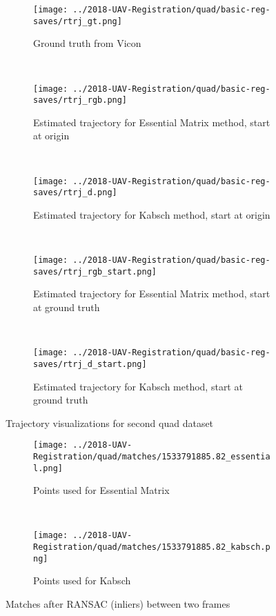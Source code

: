 \documentclass[12pt,a4paper]{article}
\begin{document}

\begin{figure}[p]
\begin{subfigure}[t]{\textwidth}
  \centering
    \texttt{[image: ../2018-UAV-Registration/quad/basic-reg-saves/rtrj\_gt.png]}
  \caption{Ground truth from Vicon}
  \end{subfigure}
  \\
  \begin{subfigure}[t]{0.5\textwidth}
  \centering
    \texttt{[image: ../2018-UAV-Registration/quad/basic-reg-saves/rtrj\_rgb.png]}
  \caption{Estimated trajectory for Essential Matrix method, start at origin}
  \end{subfigure}%
  ~
  \begin{subfigure}[t]{0.5\textwidth}
  \centering
    \texttt{[image: ../2018-UAV-Registration/quad/basic-reg-saves/rtrj\_d.png]}
  \caption{Estimated trajectory for Kabsch method, start at origin}
  \end{subfigure}
  \\
  \begin{subfigure}[t]{0.5\textwidth}
  \centering
    \texttt{[image: ../2018-UAV-Registration/quad/basic-reg-saves/rtrj\_rgb\_start.png]}
  \caption{Estimated trajectory for Essential Matrix method, start at ground truth}
  \end{subfigure}%
  ~
  \begin{subfigure}[t]{0.5\textwidth}
  \centering
    \texttt{[image: ../2018-UAV-Registration/quad/basic-reg-saves/rtrj\_d\_start.png]}
  \caption{Estimated trajectory for Kabsch method, start at ground truth}
  \end{subfigure}
  \caption{Trajectory visualizations for second quad dataset}
  \label{f: quad2 trj}
\end{figure}

\begin{figure}[h]
  \centering
  \begin{subfigure}[t]{\textwidth}
  \centering
  \texttt{[image: ../2018-UAV-Registration/quad/matches/1533791885.82\_essential.png]}
  \caption{Points used for Essential Matrix}
  \end{subfigure}%
  \\
  \begin{subfigure}[t]{\textwidth}
  \centering
  \texttt{[image: ../2018-UAV-Registration/quad/matches/1533791885.82\_kabsch.png]}
  \caption{Points used for Kabsch}
  \end{subfigure}%
  \caption{Matches after RANSAC (inliers) between two frames}
  \label{f: matches}
\end{figure}
\end{document}
